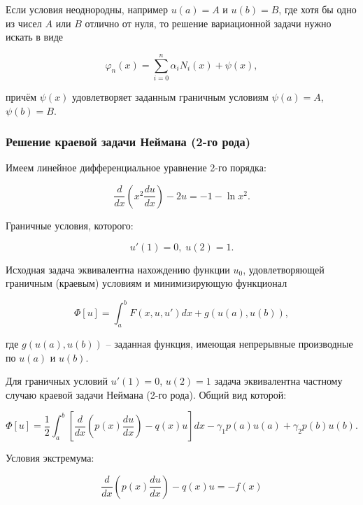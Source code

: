 \documentclass{article}
\begin{document}
Если условия неоднородны, например $u(a) = A$ и $u(b) = B$, где хотя бы одно из чисел $A$ или $B$ отлично от нуля, то решение вариационной задачи нужно искать в виде

\begin{equation}\label{equation_solve_var_rank_2}
	\varphi_{n}(x) = \sum_{i=0}^n \alpha_{i}N_{i}(x) + \psi(x),
\end{equation}

\noindent причём $\psi(x)$ удовлетворяет заданным граничным условиям $\psi(a) = A$, $\psi(b) = B$.

\subsubsection{Решение краевой задачи Неймана (2-го рода)}

Имеем линейное дифференциальное уравнение 2-го порядка:

\begin{displaymath}
	\frac{d}{dx} \left( x^2 \frac{d u}{dx} \right) - 2u = -1 - \ln{x^2}.
\end{displaymath}

\noindent Граничные условия, которого:

\begin{displaymath}
	u'(1) = 0, \; u(2) = 1.
\end{displaymath}

Исходная задача эквивалентна нахождению функции $u_{0}$, удовлетворяющей граничным (краевым) условиям и минимизирующую функционал

\begin{displaymath}
	\Phi[u] = \int_{a}^{b} F(x, u, u')dx + g(u(a), u(b)),
\end{displaymath}

\noindent где $g(u(a), u(b))$ – заданная функция, имеющая непрерывные производные по $u(a)$ и $u(b)$.

Для граничных условий $u'(1) = 0$, $u(2) = 1$ задача эквивалентна частному случаю краевой задачи Неймана (2-го рода). Общий вид которой:

\begin{displaymath}
	\Phi[u] = \frac{1}{2} \int_{a}^{b} \left[ \frac{d}{dx} \left( p(x) \frac{d u}{dx} \right) - q(x)u \right] dx - \gamma_{1} p(a) u(a) + \gamma_{2} p(b) u(b).
\end{displaymath}

\noindent Условия экстремума:

\begin{displaymath}
	\frac{d}{dx} \left( p(x) \frac{d u}{dx} \right) - q(x)u = -f(x)
\end{displaymath}
\end{document}
